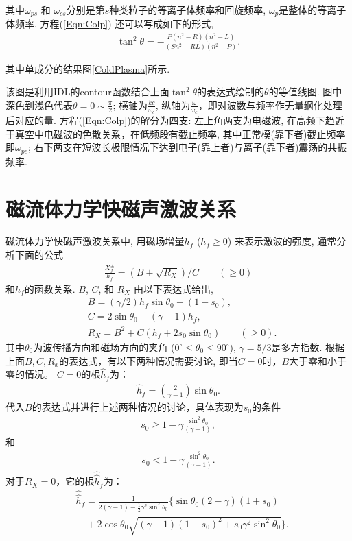\documentclass{article}
\begin{document}
	其中$\omega_{ps}$ 和 $\omega_{cs}$分别是第$s$种类粒子的等离子体频率和回旋频率, $\omega_p$是整体的等离子体频率. 方程(\ref{Eqn:Colp}) 还可以写成如下的形式,
	\begin{align*}
		\tan^2 \theta = - \frac{P (n^2 - R) (n^2 - L)}{(S n^2 - R L) (n^2 - P)}.
	\end{align*}
	
	其中单成分的结果图\ref{ColdPlasma}所示. 

	该图是利用IDL的contour函数结合上面$\tan^2\theta$的表达式绘制的$\theta$的等值线图. 图中深色到浅色代表$\theta=0\sim \frac{\pi}{2}$; 横轴为$\frac{kc}{\omega_c}$, 纵轴为$\frac{\omega}{\omega_c}$，即对波数与频率作无量纲化处理后对应的量.
	方程(\ref{Eqn:Colp})的解分为四支: 左上角两支为电磁波, 在高频下趋近于真空中电磁波的色散关系，在低频段有截止频率, 其中正常模(靠下者)截止频率即$\omega_{pe}$; 右下两支在短波长极限情况下达到电子(靠上者)与离子(靠下者)震荡的共振频率\citep{Chen2017}.
	
	\section{磁流体力学快磁声激波关系}
	
	磁流体力学快磁声激波关系中\citep{Jeffrey1964}, 用磁场增量$h_f$ ($h_f \ge 0$)
	来表示激波的强度, 通常分析下面的公式
	\begin{align}
		\frac{X_f^\pm}{h_f} = (B \pm \sqrt{R_X})/C \qquad (\ge 0) \label{Eqn:fShock}
	\end{align}
	和$h_f$的函数关系. $B$, $C$, 和 $R_X$ 由以下表达式给出,
	\begin{align}
		& B = (\gamma/2) h_f \sin\theta_0 - (1-s_0),
		\\
		& C = 2 \sin\theta_0 - (\gamma-1) h_f,
		\\
		& R_X = B^2 + C(h_f + 2 s_0 \sin\theta_0) \qquad (\ge 0).
	\end{align}
	其中$\theta_0$为波传播方向和磁场方向的夹角 ($0^\circ \le \theta_0 \le 90^\circ$),
	$\gamma=5/3$是多方指数. 根据上面$B, C, R_x$的表达式，有以下两种情况需要讨论, 即当$C=0$时，$B$大于零和小于零的情况。
	$C=0$的根$\hat{h}_f$为：
	\begin{align}\label{3_1}
		\hat{h}_f = \left(\frac{2}{\gamma-1}\right) \sin\theta_0.
	\end{align}
	代入$B$的表达式并进行上述两种情况的讨论，具体表现为$s_0$的条件
	\begin{align}\label{3_2}
		s_0 \ge 1 - \gamma \frac{\sin^2\theta_0}{(\gamma-1)},
	\end{align}
	和
	\begin{align}\label{3_3}
		s_0 < 1 - \gamma \frac{\sin^2\theta_0}{(\gamma-1)}.
	\end{align}
	对于$R_X = 0$，它的根$\hat{\hat{h}}_f$为：
	\begin{align}\label{3_4}
		& \hat{\hat{h}}_f = \frac{1}{2(\gamma-1) - \frac{1}{2} \gamma^2 \sin^2
			\theta_0}\Big\{\sin\theta_0
		(2-\gamma)(1+s_0) \nonumber
		\\
		& \quad + 2\cos\theta_0 \sqrt{(\gamma-1)(1-s_0)^2 + s_0 \gamma^2 \sin^2\theta_0}\Big\}.
	\end{align}
	
\end{document}
